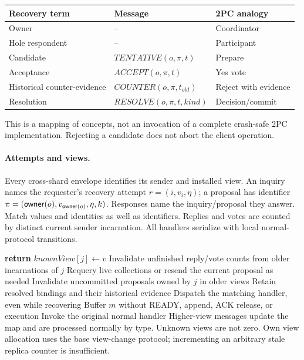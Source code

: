 \begin{center}
\begin{tabular}{lll}
\textbf{Recovery term} & \textbf{Message} & \textbf{2PC analogy}\\\hline
Owner & -- & Coordinator\\
Hole respondent & -- & Participant\\
Candidate & $TENTATIVE(o,\pi,t)$ & Prepare\\
Acceptance & $ACCEPT(o,\pi,t)$ & Yes vote\\
Historical counter-evidence & $COUNTER(o,\pi,t_{old})$ & Reject with evidence\\
Resolution & $RESOLVE(o,\pi,t,kind)$ & Decision/commit\\
\end{tabular}
\end{center}
This is a mapping of concepts, not an invocation of a complete crash-safe 2PC
implementation. Rejecting a candidate does not abort the client operation.

\paragraph{Attempts and views.}
Every cross-shard envelope identifies its sender and installed view.
An inquiry names the requester's recovery attempt $r=(i,v_i,\eta)$; a proposal
has identifier $\pi=(\mathsf{owner}(o),v_{\mathsf{owner}(o)},\eta,k)$. Responses name the
inquiry/proposal they answer. Match values and identities as well as identifiers.
Replies and votes are counted by distinct current sender incarnation.
All handlers serialize with local normal-protocol transitions.

\begin{algorithm}[p]
\caption{View filtering and dispatch}
\begin{algorithmic}[1]
    \State \textbf{return}
  \EndIf
    \State $knownView[j]\gets v$
    \State Invalidate unfinished reply/vote counts from older incarnations of $j$
    \State Requery live collections or resend the current proposal as needed
    \State Invalidate uncommitted proposals owned by $j$ in older views
    \State Retain resolved bindings and their historical evidence
  \EndIf
    \State Dispatch the matching handler, even while recovering
    \State Buffer $m$ without READY, append, ACK release, or execution
  \Else
    \State Invoke the original normal handler
  \EndIf
\EndProcedure
\Statex Higher-view messages update the map and are processed normally by type.
\Statex Unknown views are not zero. Own view allocation uses the base view-change
\Statex protocol; incrementing an arbitrary stale replica counter is insufficient.
\end{algorithmic}
\end{algorithm}

